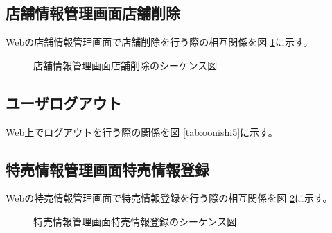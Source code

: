 \documentclass[a4j]{jarticle}
\begin{document}
\subsection{店舗情報管理画面店舗削除}
Webの店舗情報管理画面で店舗削除を行う際の相互関係を図 \ref {tab:oonishi4}に示す。
\begin{figure}[H]
\begin{center}
\caption{店舗情報管理画面店舗削除のシーケンス図}
\label{tab:oonishi4}
\end{center}
\end{figure}
\subsection{ユーザログアウト}%
Web上でログアウトを行う際の関係を図 \ref {tab:oonishi5}に示す。
\subsection{特売情報管理画面特売情報登録}
Webの特売情報管理画面で特売情報登録を行う際の相互関係を図 \ref {tab:oonishi21}に示す。
\begin{figure}[H]
\begin{center}
\caption{特売情報管理画面特売情報登録のシーケンス図}
\label{tab:oonishi21}
\end{center}
\end{figure}
\end{document}
